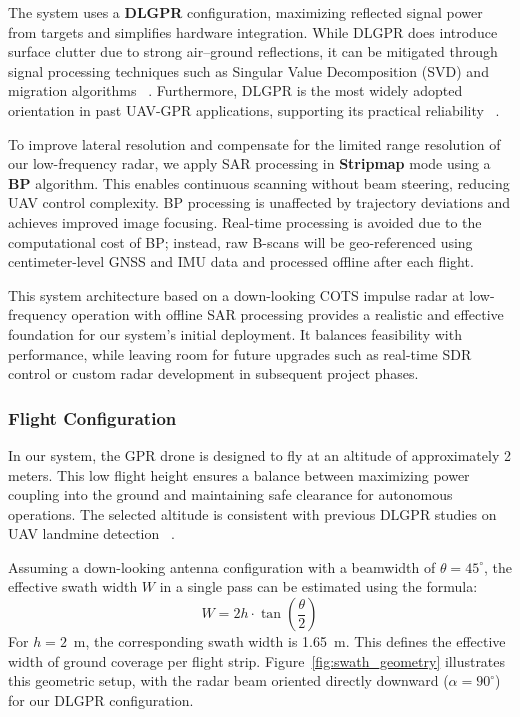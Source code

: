 The system uses a \textbf{DLGPR} configuration, maximizing reflected signal power from targets and simplifies hardware integration. While DLGPR does introduce surface clutter due to strong air–ground reflections, it can be mitigated through signal processing techniques such as Singular Value Decomposition (SVD) and migration algorithms ~\cite{garcia2024comparison}. Furthermore, DLGPR is the most widely adopted orientation in past UAV-GPR applications, supporting its practical reliability ~\cite{alqudsi2021review}.

To improve lateral resolution and compensate for the limited range resolution of our low-frequency radar, we apply SAR processing in \textbf{Stripmap} mode using a \textbf{BP} algorithm. This enables continuous scanning without beam steering, reducing UAV control complexity. BP processing is unaffected by trajectory deviations and achieves improved image focusing. Real-time processing is avoided due to the computational cost of BP; instead, raw B-scans will be geo-referenced using centimeter-level GNSS and IMU data and processed offline after each flight.


This system architecture based on a down-looking COTS impulse radar at low-frequency operation with offline SAR processing provides a realistic and effective foundation for our system’s initial deployment. It balances feasibility with performance, while leaving room for future upgrades such as real-time SDR control or custom radar development in subsequent project phases.



\subsubsection{Flight Configuration}

In our system, the GPR drone is designed to fly at an altitude of approximately 2 meters. This low flight height ensures a balance between maximizing power coupling into the ground and maintaining safe clearance for autonomous operations. The selected altitude is consistent with previous DLGPR studies on UAV landmine detection ~\cite{schartel2018uav,alqudsi2021review}.

Assuming a down-looking antenna configuration with a beamwidth of $\theta = 45^\circ$, the effective swath width $W$ in a single pass can be estimated using the formula:
\[
W = 2h \cdot \tan\left(\frac{\theta}{2}\right)
\]
For $h = 2$~m, the corresponding swath width is 1.65~m. This defines the effective width of ground coverage per flight strip. Figure~\ref{fig:swath_geometry} illustrates this geometric setup, with the radar beam oriented directly downward ($\alpha = 90^\circ$) for our DLGPR configuration.

